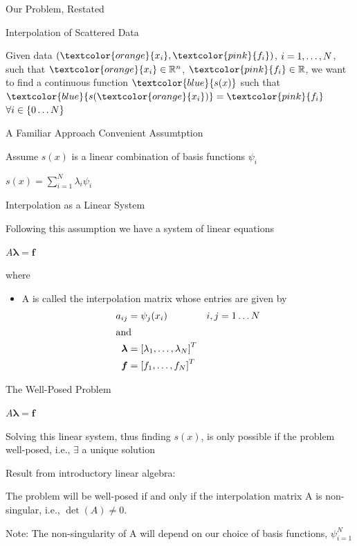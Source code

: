 \documentclass[12pt,t]{beamer}
\newcommand{\bi}{\begin{itemize}}
\newcommand{\ei}{\end{itemize}}
\newcommand{\subt}[1]{{\footnotesize \color{subtitle} {#1}}}
\begin{document}
\begin{frame}[c]{Our Problem, Restated}

\subt{Interpolation of Scattered Data}

Given data $(\textcolor{orange}{x_i},\textcolor{pink}{f_i})$, $i=1, \mathellipsis, N$, such that $\textcolor{orange}{x_i} \in \mathbb{R}^n$, $\textcolor{pink}{f_i} \in \mathbb{R}$, we want to find a continuous function $\textcolor{blue}{s(x)}$ such that $\textcolor{blue}{s(\textcolor{orange}{x_i})}=\textcolor{pink}{f_i}$ $\forall i\in\{0 \mathellipsis N \}$


\note{}
\end{frame}

\begin{frame}{A Familiar Approach}
\subt{Convenient Assumtption}

Assume $s(x)$ is a linear combination of \subt{basis functions} $\psi_i$
\begin{center}
$s(x)=\sum_{i=1}^N \lambda_i \psi_i$
\end{center}

\subt{Interpolation as a Linear System}

Following this assumption we have a system of linear equations
\begin{center}
$A\boldsymbol{\lambda}=\boldsymbol{f}$
\end{center}
 where
 \bi
\item[A] is called the \subt{interpolation matrix} whose entries are given by\\
\begin{align*}
a_{ij}&=\psi_j(x_i) & i,j= 1 \mathellipsis N\\
\intertext{and}
\boldsymbol{\lambda} &=\left[ \lambda_1, \mathellipsis, \lambda_N \right]^T\\
\boldsymbol{f} &=\left[ f_1, \mathellipsis, f_N \right]^T
\end{align*}
\ei

\note{}
\end{frame}

\begin{frame}{The Well-Posed Problem}
\begin{center}
$A\boldsymbol{\lambda}=\boldsymbol{f}$
\end{center}

Solving this linear system, thus finding $s(x)$, is only possible if the problem \subt{well-posed}, i.e., $\exists$ a unique solution 
\bigskip

\subt{Result from introductory linear algebra:} 

The problem will be well-posed if and only if the interpolation matrix A is \subt{non-singular}, i.e., $\det(A)\neq0$.
\bigskip

\subt{Note:} The non-singularity of A will depend on our choice of basis functions, $\psi_{i=1}^N$

\end{frame}
\end{document}
